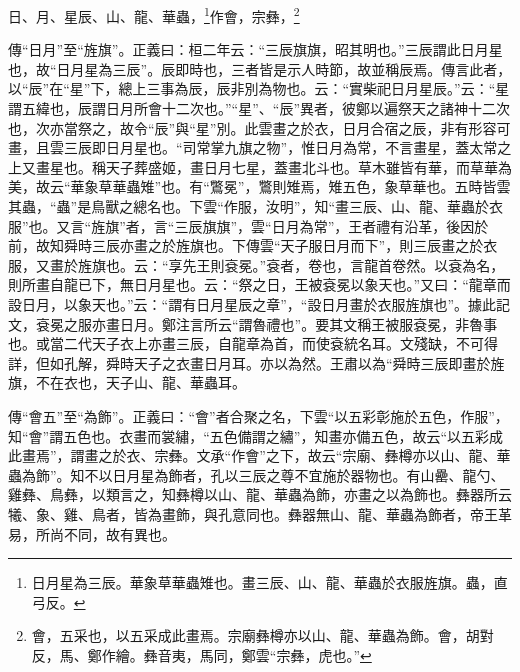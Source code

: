 日、月、星辰、山、龍、華蟲，\footnote{日月星為三辰。華象草華蟲雉也。畫三辰、山、龍、華蟲於衣服旌旗。蟲，直弓反。}作會，宗彝，\footnote{會，五采也，以五采成此畫焉。宗廟彝樽亦以山、龍、華蟲為飾。會，胡對反，馬、鄭作繪。彝音夷，馬同，鄭雲“宗彝，虎也。”}


{\noindent\zhuan{}\fzbyks 傳“日月”至“旌旗”。正義曰：桓二年云：“三辰旗旗，昭其明也。”三辰謂此日月星也，故“日月星為三辰”。辰即時也，三者皆是示人時節，故並稱辰焉。傳言此者，以“辰”在“星”下，總上三事為辰，辰非別為物也。云：“實柴祀日月星辰。”云：“星謂五緯也，辰謂日月所會十二次也。”“星”、“辰”異者，彼鄭以遍祭天之諸神十二次也，次亦當祭之，故令“辰”與“星”別。此雲畫之於衣，日月合宿之辰，非有形容可畫，且雲三辰即日月星也。“司常掌九旗之物”，惟日月為常，不言畫星，蓋太常之上又畫星也。稱天子葬盛姬，畫日月七星，蓋畫北斗也。草木雖皆有華，而草華為美，故云“華象草華蟲雉”也。有“鷩冕”，鷩則雉焉，雉五色，象草華也。五時皆雲其蟲，“蟲”是鳥獸之總名也。下雲“作服，汝明”，知“畫三辰、山、龍、華蟲於衣服”也。又言“旌旗”者，言“三辰旗旗”，雲“日月為常”，王者禮有沿革，後因於前，故知舜時三辰亦畫之於旌旗也。下傳雲“天子服日月而下”，則三辰畫之於衣服，又畫於旌旗也。云：“享先王則袞冕。”袞者，卷也，言龍首卷然。以袞為名，則所畫自龍已下，無日月星也。云：“祭之日，王被袞冕以象天也。”又曰：“龍章而設日月，以象天也。”云：“謂有日月星辰之章”，“設日月畫於衣服旌旗也”。據此記文，袞冕之服亦畫日月。鄭注言所云“謂魯禮也”。要其文稱王被服袞冕，非魯事也。或當二代天子衣上亦畫三辰，自龍章為首，而使袞統名耳。文殘缺，不可得詳，但如孔解，舜時天子之衣畫日月耳。亦以為然。王肅以為“舜時三辰即畫於旌旗，不在衣也，天子山、龍、華蟲耳。 \par}

{\noindent\zhuan{}\fzbyks 傳“會五”至“為飾”。正義曰：“會”者合聚之名，下雲“以五彩彰施於五色，作服”，知“會”謂五色也。衣畫而裳繡，“五色備謂之繡”，知畫亦備五色，故云“以五彩成此畫焉”，謂畫之於衣、宗彝。文承“作會”之下，故云“宗廟、彝樽亦以山、龍、華蟲為飾”。知不以日月星為飾者，孔以三辰之尊不宜施於器物也。有山罍、龍勺、雞彝、鳥彝，以類言之，知彝樽以山、龍、華蟲為飾，亦畫之以為飾也。彝器所云犧、象、雞、鳥者，皆為畫飾，與孔意同也。彝器無山、龍、華蟲為飾者，帝王革易，所尚不同，故有異也。 \par}

